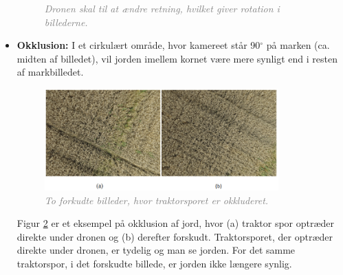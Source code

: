 \begin{itemize}
{\begin{figure}[H]
     \vspace{-1em}
    \begin{center} 
       \caption{\textcolor{gray}{\footnotesize \textit{Dronen skal til at ændre retning, hvilket giver rotation i billederne.}}}
    \label{fig:rotation}
     \end{center}
     \vspace{-2.5em}
  \end{figure} \noindent}
\item{\textbf{Okklusion:}
I et cirkulært område, hvor kamereet står 90$^{\circ}$ på marken (ca. midten af billedet), vil jorden imellem kornet være mere synligt end i resten af markbilledet.
\begin{figure}[H]
    \centering
    \includegraphics[width=0.85\textwidth]{fig/18.png}
     \vspace{-1em}
    \begin{center}    
       \caption{\textcolor{gray}{\footnotesize \textit{ To forkudte billeder, hvor traktorsporet er okkluderet. }}}
    \label{fig:okklusion}
     \end{center}
     \vspace{-2.5em}
  \end{figure} \noindent
Figur \ref{fig:okklusion} er et eksempel på okklusion af jord, hvor (a) traktor spor optræder direkte under dronen og (b) derefter forskudt. Traktorsporet, der optræder direkte under dronen, er tydelig og man se jorden. For det samme traktorspor, i det forskudte billede, er jorden ikke længere synlig.}
\end{itemize}
